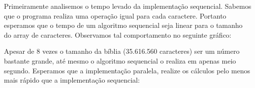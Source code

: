 \documentclass[12pt]{article}
\begin{document}
Primeiramente analisemos o tempo levado da implementação sequencial.
Sabemos que o programa realiza uma operação igual para cada caractere.
Portanto esperamos que o tempo de um algoritmo sequencial seja linear
para o tamanho do array de caracteres. Observamos tal comportamento no
seguinte gráfico:

\begin{figure}[H]
\end{figure}

Apesar de 8 vezes o tamanho da bíblia (35.616.560 caracteres) ser um
número bastante grande, até mesmo o algoritmo sequencial o realiza em
apenas meio segundo. Esperamos que a implementação paralela, realize os
cálculos pelo menos mais rápido que a implementação sequencial:

\begin{figure}[H]
\end{figure}
\end{document}
